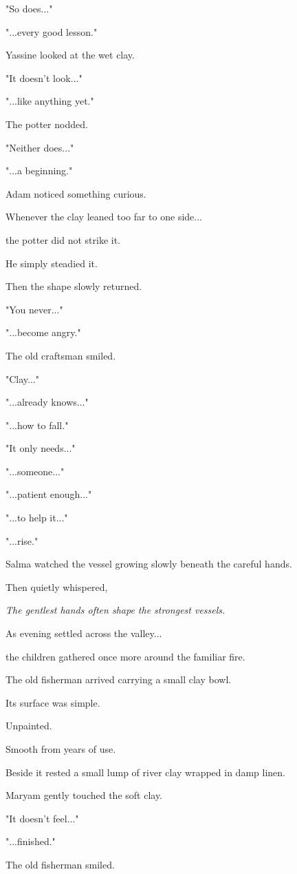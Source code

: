 \documentclass[12pt,openany]{book}
\begin{document}
"So does..."

"...every good lesson."

Yassine looked at the wet clay.

"It doesn't look..."

"...like anything yet."

The potter nodded.

"Neither does..."

"...a beginning."

Adam noticed something curious.

Whenever the clay leaned too far to one side...

the potter did not strike it.

He simply steadied it.

Then the shape slowly returned.

"You never..."

"...become angry."

The old craftsman smiled.

"Clay..."

"...already knows..."

"...how to fall."

"It only needs..."

"...someone..."

"...patient enough..."

"...to help it..."

"...rise."

Salma watched the vessel growing slowly beneath the careful hands.

Then quietly whispered,

\emph{The gentlest hands often shape the strongest vessels.}

As evening settled across the valley...

the children gathered once more around the familiar fire.

The old fisherman arrived carrying a small clay bowl.

Its surface was simple.

Unpainted.

Smooth from years of use.

Beside it rested a small lump of river clay wrapped in damp linen.

Maryam gently touched the soft clay.

"It doesn't feel..."

"...finished."

The old fisherman smiled.
\end{document}
